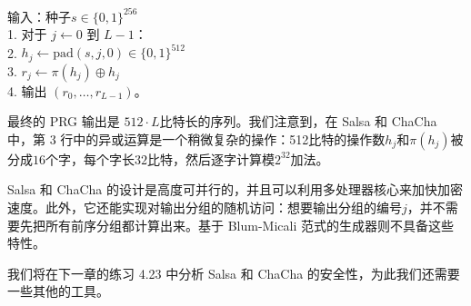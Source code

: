 \hspace*{5pt} 输入：种子$s\in\{0,1\}^{256}$\\
\hspace*{26pt} 1. 对于 $j\leftarrow0$ 到 $L-1$：\\
\hspace*{26pt} 2. \quad\quad\quad$h_j\leftarrow\mathrm{pad}(s,j,0)\in\{0,1\}^{512}$\\
\hspace*{26pt} 3. \quad\quad\quad$r_j\leftarrow\pi(h_j)\oplus h_j$\\
\hspace*{26pt} 4. 输出 $(r_0,\dots,r_{L-1})$。

\vspace*{5pt}

\noindent
最终的 PRG 输出是 $512\cdot L$比特长的序列。我们注意到，在 Salsa 和 ChaCha 中，第 3 行中的异或运算是一个稍微复杂的操作：512比特的操作数$h_j$和$\pi(h_j)$被分成$16$个字，每个字长$32$比特，然后逐字计算模$2^{32}$加法。

Salsa 和 ChaCha 的设计是高度可并行的，并且可以利用多处理器核心来加快加密速度。此外，它还能实现对输出分组的随机访问：想要输出分组的编号$j$，并不需要先把所有前序分组都计算出来。基于 Blum-Micali 范式的生成器则不具备这些特性。

我们将在下一章的练习 4.23 中分析 Salsa 和 ChaCha 的安全性，为此我们还需要一些其他的工具。

